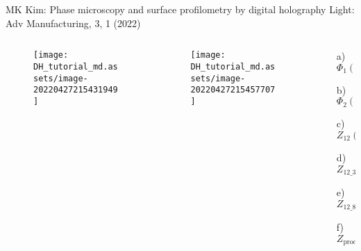 \documentclass[t, aspectratio=169]{beamer}
\begin{document}
\begin{frame}{MK Kim: Phase microscopy and surface profilometry by digital holography}
	\vspace{-3 mm}
	\small Light: Adv Manufacturing, 3, 1 (2022)
	\begin{columns}
		\begin{column}{.47\textwidth}
			\begin{figure}
				\texttt{[image: DH\_tutorial\_md.assets/image-20220427215431949]}
			\end{figure}
		\end{column}
		\begin{column}{.28\textwidth}
			\begin{figure}
				\texttt{[image: DH\_tutorial\_md.assets/image-20220427215457707]}
			\end{figure}
		\end{column}
		\begin{column}{.25\textwidth}
			\begin{itemize}
				\item[a) ] $ \Phi_1(x,y) $
				\item[b) ] $ \Phi_2(x,y) $
				\item[c) ] $ Z_{12}(x,y) $
				\item[d) ] $ Z_{12\_3}(x,y) $
				\item[e) ] $ Z_{12\_8}(x,y) $
				\item[f) ] $ Z_{\textrm{proc}}(x,y) $
			\end{itemize}
		\end{column}
	\end{columns}
\end{frame}
\end{document}
